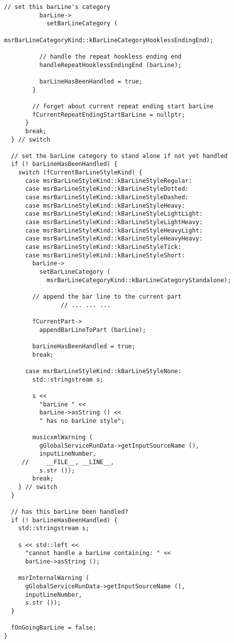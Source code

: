 \begin{lstlisting}[language=CPlusPlus]
          // set this barLine's category
          barLine->
            setBarLineCategory (
              msrBarLineCategoryKind::kBarLineCategoryHooklessEndingEnd);

          // handle the repeat hookless ending end
          handleRepeatHooklessEndingEnd (barLine);

          barLineHasBeenHandled = true;
        }

        // forget about current repeat ending start barLine
        fCurrentRepeatEndingStartBarLine = nullptr;
      }
      break;
  } // switch

  // set the barLine category to stand alone if not yet handled
  if (! barLineHasBeenHandled) {
    switch (fCurrentBarLineStyleKind) {
      case msrBarLineStyleKind::kBarLineStyleRegular:
      case msrBarLineStyleKind::kBarLineStyleDotted:
      case msrBarLineStyleKind::kBarLineStyleDashed:
      case msrBarLineStyleKind::kBarLineStyleHeavy:
      case msrBarLineStyleKind::kBarLineStyleLightLight:
      case msrBarLineStyleKind::kBarLineStyleLightHeavy:
      case msrBarLineStyleKind::kBarLineStyleHeavyLight:
      case msrBarLineStyleKind::kBarLineStyleHeavyHeavy:
      case msrBarLineStyleKind::kBarLineStyleTick:
      case msrBarLineStyleKind::kBarLineStyleShort:
        barLine->
          setBarLineCategory (
            msrBarLineCategoryKind::kBarLineCategoryStandalone);

        // append the bar line to the current part
				// ... ... ...

        fCurrentPart->
          appendBarLineToPart (barLine);

        barLineHasBeenHandled = true;
        break;

      case msrBarLineStyleKind::kBarLineStyleNone:
        std::stringstream s;

        s <<
          "barLine " <<
          barLine->asString () <<
          " has no barLine style";

        musicxmlWarning (
          gGlobalServiceRunData->getInputSourceName (),
          inputLineNumber,
     //     __FILE__, __LINE__,
          s.str ());
        break;
    } // switch
  }

  // has this barLine been handled?
  if (! barLineHasBeenHandled) {
    std::stringstream s;

    s << std::left <<
      "cannot handle a barLine containing: " <<
      barLine->asString ();

    msrInternalWarning (
      gGlobalServiceRunData->getInputSourceName (),
      inputLineNumber,
      s.str ());
  }

  fOnGoingBarLine = false;
}
\end{lstlisting}


